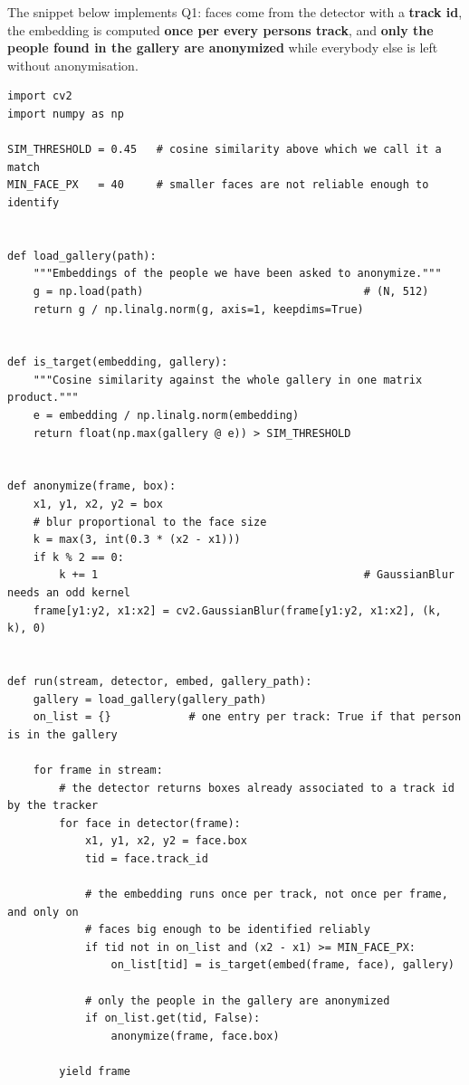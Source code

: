 \documentclass[11pt,a4paper]{article}
\begin{document}
The snippet below implements Q1: faces come from the detector with a
\textbf{track id}, the embedding is computed \textbf{once per every persons track}, and \textbf{only the people found in the gallery are anonymized} while everybody else
is left without anonymisation. 
\begin{Verbatim}
import cv2
import numpy as np

SIM_THRESHOLD = 0.45   # cosine similarity above which we call it a match
MIN_FACE_PX   = 40     # smaller faces are not reliable enough to identify


def load_gallery(path):
    """Embeddings of the people we have been asked to anonymize."""
    g = np.load(path)                                  # (N, 512)
    return g / np.linalg.norm(g, axis=1, keepdims=True)


def is_target(embedding, gallery):
    """Cosine similarity against the whole gallery in one matrix product."""
    e = embedding / np.linalg.norm(embedding)
    return float(np.max(gallery @ e)) > SIM_THRESHOLD


def anonymize(frame, box):
    x1, y1, x2, y2 = box
    # blur proportional to the face size
    k = max(3, int(0.3 * (x2 - x1)))
    if k % 2 == 0:
        k += 1                                         # GaussianBlur needs an odd kernel
    frame[y1:y2, x1:x2] = cv2.GaussianBlur(frame[y1:y2, x1:x2], (k, k), 0)


def run(stream, detector, embed, gallery_path):
    gallery = load_gallery(gallery_path)
    on_list = {}            # one entry per track: True if that person is in the gallery

    for frame in stream:
        # the detector returns boxes already associated to a track id by the tracker
        for face in detector(frame):
            x1, y1, x2, y2 = face.box
            tid = face.track_id

            # the embedding runs once per track, not once per frame, and only on
            # faces big enough to be identified reliably
            if tid not in on_list and (x2 - x1) >= MIN_FACE_PX:
                on_list[tid] = is_target(embed(frame, face), gallery)

            # only the people in the gallery are anonymized
            if on_list.get(tid, False):
                anonymize(frame, face.box)

        yield frame
\end{Verbatim}
\end{document}
